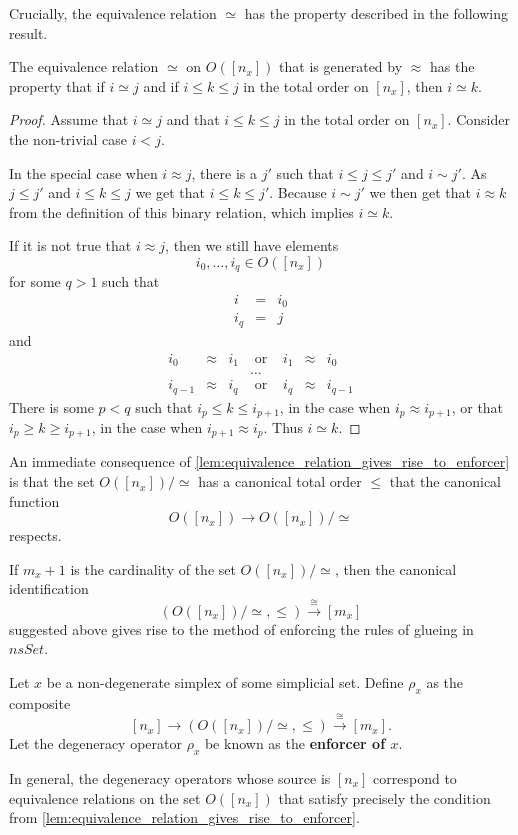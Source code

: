 Crucially, the equivalence relation $\simeq$ has the property described in the following result.
\begin{lemma}\label{lem:equivalence_relation_gives_rise_to_enforcer}
The equivalence relation $\simeq$ on $O([n_x])$ that is generated by $\approx$ has the property that if $i\simeq j$ and if $i\leq k\leq j$ in the total order on $[n_x]$, then $i\simeq k$.
\end{lemma}
\begin{proof}
Assume that $i\simeq j$ and that $i\leq k\leq j$ in the total order on $[n_x]$. Consider the non-trivial case $i<j$.

In the special case when $i\approx j$, there is a $j'$ such that $i\leq j\leq j'$ and $i\sim j'$. As $j\leq j'$ and $i\leq k\leq j$ we get that $i\leq k\leq j'$. Because $i\sim j'$ we then get that $i\approx k$ from the definition of this binary relation, which implies $i\simeq k$.

If it is not true that $i\approx j$, then we still have elements
\[i_0,\dots ,i_q\in O([n_x])\]
for some $q>1$ such that
\begin{displaymath}
\begin{array}{rcl}
i & = & i_0 \\
i_q & = & j
\end{array}
\end{displaymath}
and
\begin{displaymath}
\begin{array}{rclcrcl}
i_0 & \approx & i_1 & \textrm{ or } & i_1 & \approx & i_0 \\
&&& \dots \\
i_{q-1} & \approx & i_q & \textrm{ or } & i_q & \approx & i_{q-1}
\end{array}
\end{displaymath}
There is some $p<q$ such that $i_p\leq k\leq i_{p+1}$, in the case when $i_p\approx i_{p+1}$, or that $i_p\geq k\geq i_{p+1}$, in the case when $i_{p+1}\approx i_p$. Thus $i\simeq k$.
\end{proof}
\noindent An immediate consequence of \cref{lem:equivalence_relation_gives_rise_to_enforcer} is that the set $O([n_x])/\simeq$ has a canonical total order $\leq$ that the canonical function
\[O([n_x])\to O([n_x])/\simeq\]
respects.

If $m_x+1$ is the cardinality of the set $O([n_x])/\simeq$, then the canonical identification
\[(O([n_x])/\simeq ,\leq )\xrightarrow{\cong } [m_x]\]
suggested above gives rise to the method of enforcing the rules of glueing in $nsSet$.
\begin{definition}\label{def:enforcer}
Let $x$ be a non-degenerate simplex of some simplicial set. Define $\rho _x$ as the composite
\[[n_x]\to (O([n_x])/\simeq ,\leq )\xrightarrow{\cong } [m_x].\]
Let the degeneracy operator $\rho _x$ be known as the \textbf{enforcer of $x$}.
\end{definition}
\noindent In general, the degeneracy operators whose source is $[n_x]$ correspond to equivalence relations on the set $O([n_x])$ that satisfy precisely the condition from \cref{lem:equivalence_relation_gives_rise_to_enforcer}.

